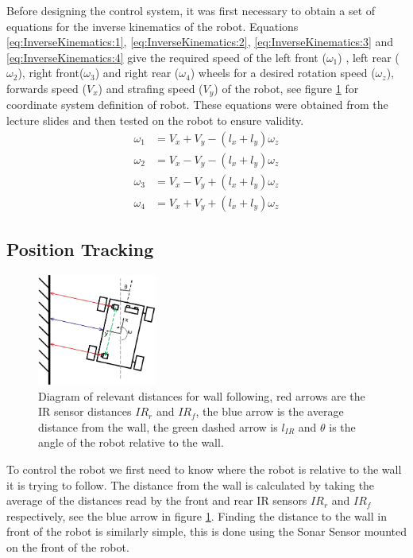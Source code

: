 \documentclass[11pt]{article}
\begin{document}
\par Before designing the control system, it was first necessary to obtain a set of equations for the inverse kinematics of the robot. Equations \ref{eq:InverseKinematics:1}, \ref{eq:InverseKinematics:2}, \ref{eq:InverseKinematics:3} and \ref{eq:InverseKinematics:4} give the required speed of the left front ($\omega_{1}$) , left rear ($\omega_{2}$), right front($\omega_{3}$) and right rear ($\omega_{4}$) wheels for a desired rotation speed ($\omega_{z}$), forwards speed ($V_{x}$) and strafing speed ($V_{y}$) of the robot, see figure \ref{fig:WallFollow} for coordinate system definition of robot. These equations were obtained from the lecture slides and then tested on the robot to ensure validity.
\begin{align}
    \omega_{1} &= V_{x} + V_{y} - (l_{x} + l_{y})\omega_{z}\label{eq:InverseKinematics:1}\\ 
    \omega_{2} &= V_{x} - V_{y} - (l_{x} + l_{y})\omega_{z}\label{eq:InverseKinematics:2}\\ 
    \omega_{3} &= V_{x} - V_{y} + (l_{x} + l_{y})\omega_{z}\label{eq:InverseKinematics:3}\\ 
    \omega_{4} &= V_{x} + V_{y} + (l_{x} + l_{y})\omega_{z} \label{eq:InverseKinematics:4}
\end{align}
\subsection{Position Tracking}
\begin{figure}
    \includegraphics[width=0.35\textwidth]{WallFollow.PNG}
    \caption{Diagram of relevant distances for wall following, red arrows are the IR sensor distances $IR_{r}$ and  $IR_{f}$, the blue arrow is the average distance from the wall, the green dashed arrow is $l_{IR}$ and $\theta$ is the angle of the robot relative to the wall.}
    \label{fig:WallFollow}
\end{figure}

\par To control the robot we first need to know where the robot is relative to the wall it is trying to follow. The distance from the wall is calculated by taking the average of the distances read by the front and rear IR sensors $IR_{r}$ and  $IR_{f}$ respectively, see the blue arrow in figure \ref{fig:WallFollow}. Finding the distance to the wall in front of the robot is similarly simple, this is done using the Sonar Sensor mounted on the front of the robot.
\end{document}
